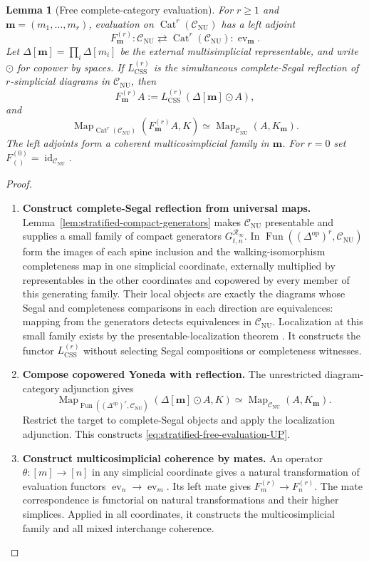\documentclass[oneside]{article}
\theoremstyle{plain}
\newtheorem{lemma}[theorem]{Lemma}
\theoremstyle{definition}
\theoremstyle{remark}
\newcommand{\CNU}{\mathcal C_{\mathrm{NU}}}
\newcommand{\Fun}{\operatorname{Fun}}
\newcommand{\Map}{\operatorname{Map}}
\newcommand{\RNU}{\mathcal R_{\infty}}
\newcommand{\id}{\operatorname{id}}
\newcommand{\op}{\mathrm{op}}
\begin{document}
\begin{lemma}[Free complete-category evaluation]
\label{lem:stratified-free-evaluation}
For $r\geq1$ and $\mathbf m=(m_1,\ldots,m_r)$,
evaluation on $\operatorname{Cat}^r(\CNU)$ has a left adjoint
\[
 F^{(r)}_{\mathbf m}:\CNU
 \rightleftarrows\operatorname{Cat}^r(\CNU)
 :\operatorname{ev}_{\mathbf m}.
\]
Let $\Delta[\mathbf m]=\prod_i\Delta[m_i]$ be the external
multisimplicial representable, and write $\odot$ for copower by spaces.
If $L_{\mathrm{CSS}}^{(r)}$ is the simultaneous complete-Segal
reflection of $r$-simplicial diagrams in $\CNU$, then
\begin{equation}\label{eq:stratified-free-evaluation-construction}
 F^{(r)}_{\mathbf m}A
 :=L_{\mathrm{CSS}}^{(r)}(\Delta[\mathbf m]\odot A),
\end{equation}
and
\begin{equation}\label{eq:stratified-free-evaluation-UP}
 \Map_{\operatorname{Cat}^r(\CNU)}
 (F^{(r)}_{\mathbf m}A,K)
 \simeq\Map_{\CNU}(A,K_{\mathbf m}).
\end{equation}
The left adjoints form a coherent multicosimplicial family in
$\mathbf m$.  For $r=0$ set
$F^{(0)}_{()}=\id_{\CNU}$.
\end{lemma}
\begin{proof}
\leavevmode
\begin{enumerate}
\item \textbf{Construct complete-Segal reflection from universal maps.}
Lemma~\ref{lem:stratified-compact-generators} makes $\CNU$
presentable and supplies a small family of compact generators
$G^{\RNU}_{t,n}$.  In
$\Fun((\Delta^{\op})^r,\CNU)$ form the images of each spine
inclusion and the walking-isomorphism completeness map in one
simplicial coordinate, externally multiplied by representables in the
other coordinates and copowered by every member of this generating
family.  Their local objects are exactly the diagrams whose Segal and
completeness comparisons in each direction are equivalences: mapping
from the generators detects equivalences in $\CNU$.  Localization at
this small family exists by the presentable-localization theorem
\cite[\S5.5.4]{Lurie2009}.  It constructs the functor
$L_{\mathrm{CSS}}^{(r)}$ without selecting Segal compositions or
completeness witnesses.
\item \textbf{Compose copowered Yoneda with reflection.}
The unrestricted diagram-category adjunction gives
\[
 \Map_{\Fun((\Delta^{\op})^r,\CNU)}
 (\Delta[\mathbf m]\odot A,K)
 \simeq\Map_{\CNU}(A,K_{\mathbf m}).
\]
Restrict the target to complete-Segal objects and apply the
localization adjunction.  This constructs
\eqref{eq:stratified-free-evaluation-UP}.
\item \textbf{Construct multicosimplicial coherence by mates.}
An operator $\theta:[m]\to[n]$ in any simplicial coordinate gives
a natural transformation of evaluation functors
$\operatorname{ev}_n\to\operatorname{ev}_m$.
Its left mate gives $F_m^{(r)}\to F_n^{(r)}$.
The mate correspondence is functorial on natural transformations and
their higher simplices.  Applied in all coordinates, it constructs
the multicosimplicial family and all mixed interchange coherence.
\qedhere
\end{enumerate}
\end{proof}
\end{document}
